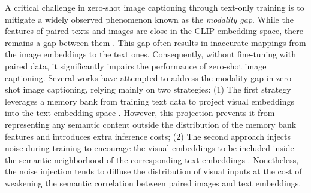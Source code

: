 A critical challenge in zero-shot image captioning through text-only training is to mitigate a widely observed phenomenon known as the \textit{modality gap}. While the features of paired texts and images are close in the CLIP embedding space, there remains a gap between them \cite{MindGap}. This gap often results in inaccurate mappings from the image embeddings to the text ones. Consequently, without fine-tuning with paired data, it significantly impairs the performance of zero-shot image captioning.
Several works have attempted to address the modality gap in zero-shot image captioning, relying mainly on two strategies: (1) The first strategy leverages a memory bank from training text data to project visual embeddings into the text embedding space \cite{DeCap}. However, this projection prevents it from representing any semantic content outside the distribution of the memory bank features and introduces extra inference costs; (2) The second approach injects noise during training to encourage the visual embeddings to be included inside the semantic neighborhood of the corresponding text embeddings \cite{CapDec}. Nonetheless, the noise injection tends to diffuse the distribution of visual inputs at the cost of weakening the semantic correlation between paired images and text embeddings. 




